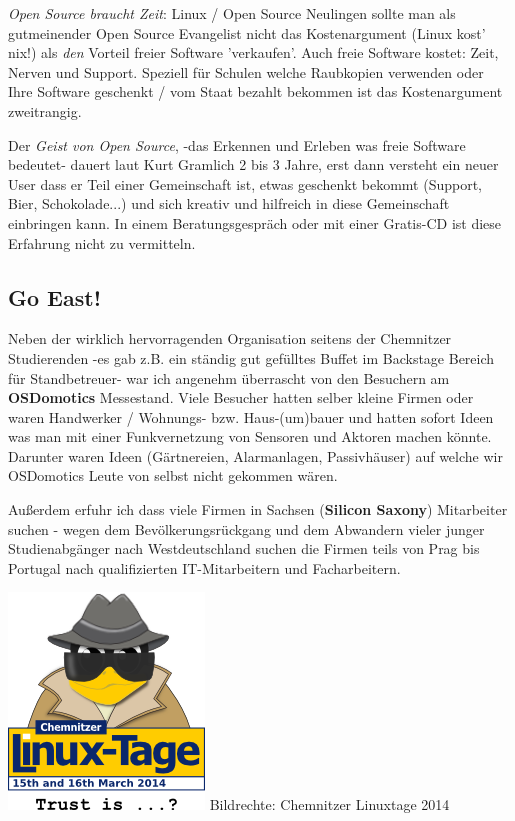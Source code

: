 \documentclass[10pt,a4paper,ngerman,twoside]{article} %
\begin{document}
\begin{multicols}{3}
\textit{Open Source braucht Zeit}: Linux / Open Source Neulingen sollte man als gutmeinender Open Source Evangelist nicht das Kostenargument (Linux kost' nix!) als \emph{den} Vorteil freier Software 'verkaufen'. Auch freie Software kostet: Zeit, Nerven und Support. Speziell für Schulen welche Raubkopien verwenden oder Ihre Software geschenkt / vom Staat bezahlt bekommen ist das Kostenargument zweitrangig. 

Der \emph{Geist von Open Source}, -das Erkennen und Erleben was freie Software bedeutet- dauert laut Kurt Gramlich 2 bis 3 Jahre, erst dann versteht ein neuer User dass er Teil einer Gemeinschaft ist, etwas geschenkt bekommt (Support, Bier, Schokolade...) und sich kreativ und hilfreich in diese Gemeinschaft einbringen kann. In einem Beratungsgespräch oder mit einer Gratis-CD ist diese Erfahrung nicht zu vermitteln.


\subsection*{Go East!}
Neben der wirklich hervorragenden Organisation seitens der Chemnitzer Studierenden -es gab z.B. ein ständig gut gefülltes Buffet im Backstage Bereich für Standbetreuer- war ich angenehm überrascht von den Besuchern am \textbf{OSDomotics} Messestand. Viele Besucher hatten selber kleine Firmen oder waren Handwerker / Wohnungs- bzw. Haus-(um)bauer und hatten sofort Ideen was man mit einer Funkvernetzung von Sensoren und Aktoren machen könnte. Darunter waren Ideen (Gärtnereien, Alarmanlagen, Passivhäuser) auf welche wir OSDomotics Leute von selbst nicht gekommen wären. 

Außerdem erfuhr ich dass viele Firmen in Sachsen (\textbf{Silicon Saxony}) Mitarbeiter suchen - wegen dem Bevölkerungsrückgang und dem Abwandern vieler junger Studienabgänger nach Westdeutschland suchen die Firmen teils von Prag bis Portugal nach qualifizierten IT-Mitarbeitern und Facharbeitern.

\begin{center}
\includegraphics[width=0.5\linewidth]{chemnitz/chemnitz_logo14.png}
\footnotesize{Bildrechte: Chemnitzer Linuxtage 2014}
\end{center}


\end{multicols}
\end{document}
